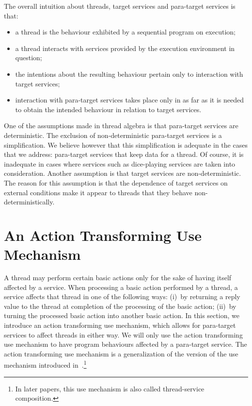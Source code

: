 \documentclass[fleqn]{llncs}
\begin{document}
The overall intuition about threads, target services and para-target
services is that:
\begin{itemize}
\item
a thread is the behaviour exhibited by a sequential program on
execution;
\item
a thread interacts with services provided by the execution environment
in question;
\item
the intentions about the resulting behaviour pertain only to interaction
with target services;
\item
interaction with para-target services takes place only in as far as it
is needed to obtain the intended behaviour in relation to target
services.
\end{itemize}

One of the assumptions made in thread algebra is that para-target
services are deterministic.
The exclusion of non-deterministic para-target services is a
simplification.
We believe however that this simplification is adequate in the cases
that we address: para-target services that keep data for a thread.
Of course, it is inadequate in cases where services such as dice-playing
services are taken into consideration.
Another assumption is that target services are non-deterministic.
The reason for this assumption is that the dependence of target services
on external conditions make it appear to threads that they behave
non-deterministically.

\section{An Action Transforming Use Mechanism}
\label{sect-TAtsc}

A thread may perform certain basic actions only for the sake of having
itself affected by a service.
When processing a basic action performed by a thread, a service affects
that thread in one of the following ways:
(i)~by returning a reply value to the thread at completion of the
processing of the basic action;
(ii)~by turning the processed basic action into another basic action.
In this section, we introduce an action transforming use mechanism,
which allows for para-target services to affect threads in either way.
We will only use the action transforming use mechanism to have program
behaviours affected by a para-target service.
The action transforming use mechanism is a generalization of the version
of the use mechanism introduced in~\cite{BM04c}.\footnote
{In later papers, this use mechanism is also called thread-service
 composition.}
\end{document}
